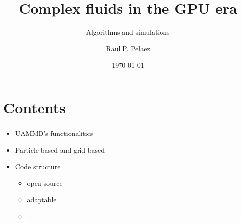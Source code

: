 \documentclass{beamer}
\title{Complex fluids in the GPU era}
\subtitle{Algorithms and simulations}
\author{Raul P. Pelaez}
\institute{Universidad Autónoma de Madrid}
\date{\today}
\begin{document}
\begin{frame}
  \titlepage
\end{frame}

\begin{frame}
  \tableofcontents
\end{frame}




\section{Contents}
\begin{frame}
  \frametitle{\insertsection}
  \begin{itemize}
  \item UAMMD's functionalities
  \item Particle-based and grid based
  \item Code structure
    \begin{itemize}
    \item open-source
    \item adaptable
    \item ...
    \end{itemize}
  \end{itemize}
\end{frame}
\end{document}
